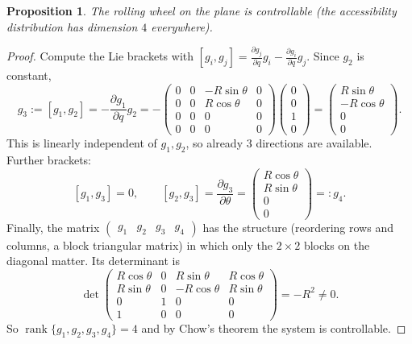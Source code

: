 \documentclass[11pt,a4paper]{article}
\def\bm#1{#1}%
\DeclareMathOperator{\rank}{rank}
\newcommand{\R}{\mathbb{R}}
\newcommand{\qv}{\bm{q}}
\theoremstyle{definition}
\theoremstyle{plain}
\newtheorem{proposition}[definition]{Proposition}
\theoremstyle{remark}
\begin{document}
\begin{proposition}\label{prop:rollwheel}
The rolling wheel on the plane is controllable (the accessibility distribution has dimension $4$ everywhere).
\end{proposition}
\begin{proof}
Compute the Lie brackets with $[\bm g_i,\bm g_j]=\frac{\partial\bm g_j}{\partial\qv}\bm g_i-\frac{\partial\bm g_i}{\partial\qv}\bm g_j$. Since $\bm g_2$ is constant,
\[
 \bm g_3:=[\bm g_1,\bm g_2]=-\frac{\partial\bm g_1}{\partial\qv}\bm g_2
 =-\begin{pmatrix}0&0&-R\sin\theta&0\\0&0&R\cos\theta&0\\0&0&0&0\\0&0&0&0\end{pmatrix}
 \begin{pmatrix}0\\0\\1\\0\end{pmatrix}=\begin{pmatrix}R\sin\theta\\-R\cos\theta\\0\\0\end{pmatrix}.
\]
This is linearly independent of $\bm g_1,\bm g_2$, so already $3$ directions are available. Further brackets:
\[
 [\bm g_1,\bm g_3]=\bm 0,\qquad [\bm g_2,\bm g_3]=\frac{\partial\bm g_3}{\partial\theta}=\begin{pmatrix}R\cos\theta\\R\sin\theta\\0\\0\end{pmatrix}=:\bm g_4 .
\]
Finally, the matrix $\begin{pmatrix}\bm g_1&\bm g_2&\bm g_3&\bm g_4\end{pmatrix}$ has the structure (reordering rows and columns, a block triangular matrix) in which only the $2\times2$ blocks on the diagonal matter. Its determinant is
\[
 \det\begin{pmatrix}R\cos\theta&0&R\sin\theta&R\cos\theta\\R\sin\theta&0&-R\cos\theta&R\sin\theta\\0&1&0&0\\1&0&0&0\end{pmatrix}=-R^2\neq0 .
\]
So $\rank\{\bm g_1,\bm g_2,\bm g_3,\bm g_4\}=4$ and by Chow's theorem the system is controllable.
\end{proof}
\end{document}
